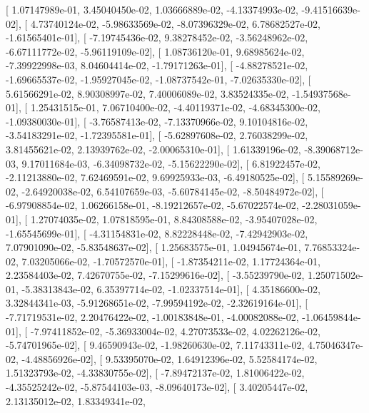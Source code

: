 \documentclass{article}
\begin{document}
       [  1.07147989e-01,   3.45040450e-02,   1.03666889e-02,
         -4.13374993e-02,  -9.41516639e-02],
       [  4.73740124e-02,  -5.98633569e-02,  -8.07396329e-02,
          6.78682527e-02,  -1.61565401e-01],
       [ -7.19745436e-02,   9.38278452e-02,  -3.56248962e-02,
         -6.67111772e-02,  -5.96119109e-02],
       [  1.08736120e-01,   9.68985624e-02,  -7.39922998e-03,
          8.04604414e-02,  -1.79171263e-01],
       [ -4.88278521e-02,  -1.69665537e-02,  -1.95927045e-02,
         -1.08737542e-01,  -7.02635330e-02],
       [  5.61566291e-02,   8.90308997e-02,   7.40006089e-02,
          3.83524335e-02,  -1.54937568e-01],
       [  1.25431515e-01,   7.06710400e-02,  -4.40119371e-02,
         -4.68345300e-02,  -1.09380030e-01],
       [ -3.76587413e-02,  -7.13370966e-02,   9.10104816e-02,
         -3.54183291e-02,  -1.72395581e-01],
       [ -5.62897608e-02,   2.76038299e-02,   3.81455621e-02,
          2.13939762e-02,  -2.00065310e-01],
       [  1.61339196e-02,  -8.39068712e-03,   9.17011684e-03,
         -6.34098732e-02,  -5.15622290e-02],
       [  6.81922457e-02,  -2.11213880e-02,   7.62469591e-02,
          9.69925933e-03,  -6.49180525e-02],
       [  5.15589269e-02,  -2.64920038e-02,   6.54107659e-03,
         -5.60784145e-02,  -8.50484972e-02],
       [ -6.97908854e-02,   1.06266158e-01,  -8.19212657e-02,
         -5.67022574e-02,  -2.28031059e-01],
       [  1.27074035e-02,   1.07818595e-01,   8.84308588e-02,
         -3.95407028e-02,  -1.65545699e-01],
       [ -4.31154831e-02,   8.82228448e-02,  -7.42942903e-02,
          7.07901090e-02,  -5.83548637e-02],
       [  1.25683575e-01,   1.04945674e-01,   7.76853324e-02,
          7.03205066e-02,  -1.70572570e-01],
       [ -1.87354211e-02,   1.17724364e-01,   2.23584403e-02,
          7.42670755e-02,  -7.15299616e-02],
       [ -3.55239790e-02,   1.25071502e-01,  -5.38313843e-02,
          6.35397714e-02,  -1.02337514e-01],
       [  4.35186600e-02,   3.32844341e-03,  -5.91268651e-02,
         -7.99594192e-02,  -2.32619164e-01],
       [ -7.71719531e-02,   2.20476422e-02,  -1.00183848e-01,
         -4.00082088e-02,  -1.06459844e-01],
       [ -7.97411852e-02,  -5.36933004e-02,   4.27073533e-02,
          4.02262126e-02,  -5.74701965e-02],
       [  9.46590943e-02,  -1.98260630e-02,   7.11743311e-02,
          4.75046347e-02,  -4.48856926e-02],
       [  9.53395070e-02,   1.64912396e-02,   5.52584174e-02,
          1.51323793e-02,  -4.33830755e-02],
       [ -7.89472137e-02,   1.81006422e-02,  -4.35525242e-02,
         -5.87544103e-03,  -8.09640173e-02],
       [  3.40205447e-02,   2.13135012e-02,   1.83349341e-02,
\end{document}
